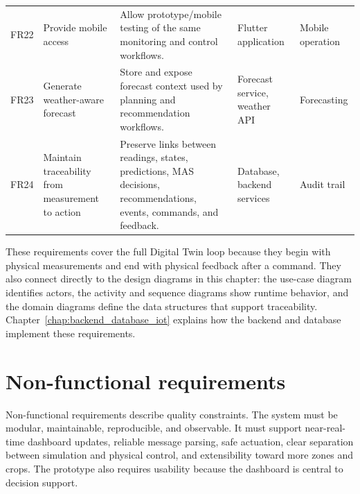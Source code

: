 \begin{footnotesize}
\begin{longtable}{@{}p{}p{}p{}p{}p{}@{}}
FR22 & Provide mobile access & Allow prototype/mobile testing of the same monitoring and control workflows. & Flutter application & Mobile operation \\
FR23 & Generate weather-aware forecast & Store and expose forecast context used by planning and recommendation workflows. & Forecast service, weather API & Forecasting \\
FR24 & Maintain traceability from measurement to action & Preserve links between readings, states, predictions, MAS decisions, recommendations, events, commands, and feedback. & Database, backend services & Audit trail \\
\bottomrule
\end{longtable}
\end{footnotesize}

These requirements cover the full Digital Twin loop because they begin with physical measurements and end with physical feedback after a command. They also connect directly to the design diagrams in this chapter: the use-case diagram identifies actors, the activity and sequence diagrams show runtime behavior, and the domain diagrams define the data structures that support traceability. Chapter~\ref{chap:backend_database_iot} explains how the backend and database implement these requirements.

\section{Non-functional requirements}

Non-functional requirements describe quality constraints. The system must be modular, maintainable, reproducible, and observable. It must support near-real-time dashboard updates, reliable message parsing, safe actuation, clear separation between simulation and physical control, and extensibility toward more zones and crops. The prototype also requires usability because the dashboard is central to decision support.

